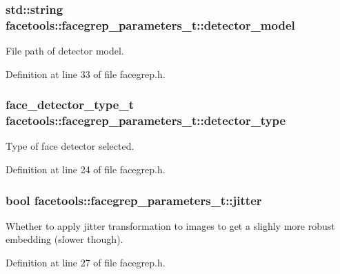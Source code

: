 \subsubsection[{\texorpdfstring{detector\+\_\+model}{detector_model}}]{\setlength{\rightskip}{0pt plus 5cm}std\+::string facetools\+::facegrep\+\_\+parameters\+\_\+t\+::detector\+\_\+model}\hypertarget{structfacetools_1_1facegrep__parameters__t_ae0f9245332cf5039caccb0da14da819a}{}\label{structfacetools_1_1facegrep__parameters__t_ae0f9245332cf5039caccb0da14da819a}
File path of detector model. 

Definition at line 33 of file facegrep.\+h.

\subsubsection[{\texorpdfstring{detector\+\_\+type}{detector_type}}]{\setlength{\rightskip}{0pt plus 5cm}face\+\_\+detector\+\_\+type\+\_\+t facetools\+::facegrep\+\_\+parameters\+\_\+t\+::detector\+\_\+type}\hypertarget{structfacetools_1_1facegrep__parameters__t_abba46f8b5beab015833874527d207d25}{}\label{structfacetools_1_1facegrep__parameters__t_abba46f8b5beab015833874527d207d25}
Type of face detector selected. 

Definition at line 24 of file facegrep.\+h.

\subsubsection[{\texorpdfstring{jitter}{jitter}}]{\setlength{\rightskip}{0pt plus 5cm}bool facetools\+::facegrep\+\_\+parameters\+\_\+t\+::jitter}\hypertarget{structfacetools_1_1facegrep__parameters__t_a8027e4ec22546d3677c89dfa1f0811e4}{}\label{structfacetools_1_1facegrep__parameters__t_a8027e4ec22546d3677c89dfa1f0811e4}
Whether to apply jitter transformation to images to get a slighly more robust embedding (slower though). 

Definition at line 27 of file facegrep.\+h.


